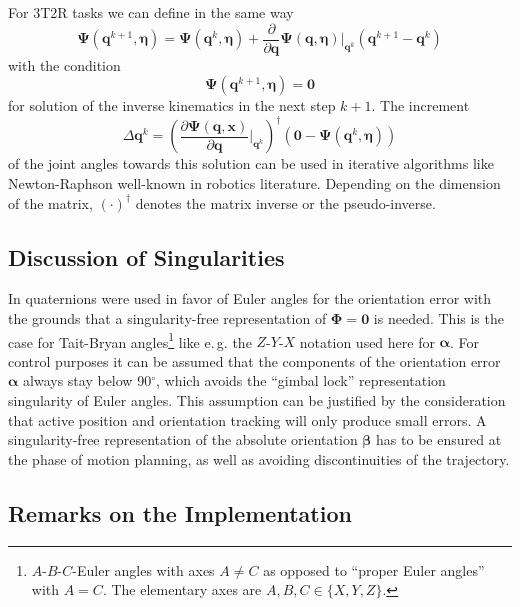 \documentclass[twocolumn,10pt]{IFTOMM}
\newcommand{\bm}[1]{\boldsymbol{#1}}
\begin{document}
For 3T2R tasks we can define in the same way
%
\begin{equation}
\bm{\Psi}(\bm{q}^{k+1},\bm{\eta}) = 
\bm{\Psi}(\bm{q}^{k},\bm{\eta})
+
\frac{\partial}{\partial \bm{q}} \bm{\Psi}(\bm{q},\bm{\eta}) \biggr\rvert_{\bm{q}^k} (\bm{q}^{k+1} - \bm{q}^k)
\end{equation}
%
with the condition
%
\begin{equation}
\bm{\Psi}(\bm{q}^{k+1},\bm{\eta})=\bm{0}
\end{equation}
%
for solution of the inverse kinematics in the next step $k+1$. The increment 
%
\begin{equation}
\Delta \bm{q}^k
=
\left(\frac{\partial \bm{\Psi}(\bm{q},\bm{x})}{\partial \bm{q}}\biggr\rvert_{\bm{q}^k}\right)^{\dagger}
(\bm{0} - \bm{\Psi}(\bm{q}^{k},\bm{\eta}))
\label{equ:deltaq_psi}
\end{equation}
%
of the joint angles towards this solution can be used in iterative algorithms like Newton-Raphson well-known in robotics literature.
Depending on the dimension of the matrix, $(\cdot)^\dagger$ denotes the matrix inverse or the pseudo-inverse.

\subsection{Discussion of Singularities}

In \cite{Zlajpah2017} quaternions were used in favor of Euler angles for the orientation error with the grounds that a singularity-free representation of $\bm{\Phi}=\bm{0}$ is needed.
This is the case for Tait-Bryan angles\footnote{$A$-$B$-$C$-Euler angles with axes $A \ne C$ as opposed to ``proper Euler angles'' with $A = C$. The elementary axes are $A,B,C \in \{ X,Y,Z\}$.} like e.\,g. the $Z$-$Y$-$X$ notation used here for $\bm{\alpha}$.
For control purposes it can be assumed that the components of the orientation error $\bm{\alpha}$ always stay below 90$^\circ$, which avoids the ``gimbal lock'' representation singularity of Euler angles.
This assumption can be justified by the consideration that active position and orientation tracking will only produce small errors.
A singularity-free representation of the absolute orientation $\bm{\beta}$ has to be ensured at the phase of motion planning, as well as avoiding discontinuities of the trajectory.

\subsection{Remarks on the Implementation}
\label{sec:RecEulAng_implement}
\end{document}
